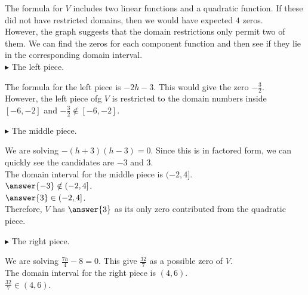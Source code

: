 \documentclass{ximera}
\begin{document}
The formula for $V$ includes two linear functions and a quadratic function.  If these did not have restricted domains, then we would have expected $4$ zeros.\\


However, the graph suggests that the domain restrictions only permit two of them.  We can find the zeros for each component function and then see if they lie in the corresponding domain interval. \\





$\blacktriangleright$ The left piece. 

\begin{explanation}

The formula for the left piece is $-2h-3$.  This would give the zero $-\frac{3}{2}$. \\

However, the left piece ofg $V$ is restricted to the domain numbers inside $[-6,-2]$ and $-\frac{3}{2} \notin [-6,-2]$.

\end{explanation}





$\blacktriangleright$ The middle piece. 


\begin{explanation}


We are solving $-(h+3)(h-3) = 0$.  Since this is in factored form, we can quickly see the candidates are $-3$ and $3$.   \\


The domain interval for the middle piece is $(-2,4]$. \\


$\answer{-3} \notin (-2,4]$. \\

$\answer{3} \in (-2,4]$. \\


Therefore, $V$ has $\answer{3}$ as its only zero contributed from the quadratic piece.

\end{explanation}



$\blacktriangleright$ The right piece. 


\begin{explanation}


We are solving $\frac{7h}{4} - 8 = 0$.  This give $\frac{32}{7}$ as a possible zero of $V$. \\


The domain interval for the right piece is $(4, 6)$. \\

$\frac{32}{7} \in (4, 6)$. \\


\end{explanation}
\end{document}
